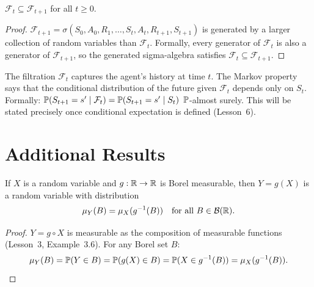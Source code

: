 \documentclass[11pt,a4paper]{article}
\begin{document}
\begin{proposition}
\label{prop:filtration_increasing}
$\mathcal{F}_t \subseteq \mathcal{F}_{t+1}$ for all $t \geq 0$.
\end{proposition}

\begin{proof}
$\mathcal{F}_{t+1} = \sigma(S_0, A_0, R_1, \ldots, S_t, A_t, R_{t+1},
S_{t+1})$ is generated by a larger collection of random variables than
$\mathcal{F}_t$. Formally, every generator of $\mathcal{F}_t$ is also a
generator of $\mathcal{F}_{t+1}$, so the generated sigma-algebra satisfies
$\mathcal{F}_t \subseteq \mathcal{F}_{t+1}$.
\end{proof}

\begin{rlconnection}[title={Connection to RL}]
The filtration $\mathcal{F}_t$ captures the agent's history at time $t$.
The Markov property says that the conditional distribution of the future
given $\mathcal{F}_t$ depends only on $S_t$. Formally:
$\mathbb{P}(S_{t+1} = s' \mid \mathcal{F}_t) = \mathbb{P}(S_{t+1} = s' \mid S_t)$
$\mathbb{P}$-almost surely. This will be stated precisely once conditional
expectation is defined (Lesson~6).
\end{rlconnection}


\section{Additional Results}
\label{sec:additional}

\begin{proposition}
\label{prop:dist_function}
If $X$ is a random variable and $g: \mathbb{R} \to \mathbb{R}$ is Borel measurable, then
$Y = g(X)$ is a random variable with distribution
\begin{equation}
  \mu_Y(B) = \mu_X(g^{-1}(B)) \quad \text{for all } B \in \mathcal{B}(\mathbb{R}).
\end{equation}
\end{proposition}

\begin{proof}
$Y = g \circ X$ is measurable as the composition of measurable functions
(Lesson~3, Example~3.6). For any Borel set $B$:
\[
  \mu_Y(B) = \mathbb{P}(Y \in B) = \mathbb{P}(g(X) \in B)
  = \mathbb{P}(X \in g^{-1}(B)) = \mu_X(g^{-1}(B)). \qedhere
\]
\end{proof}
\end{document}
